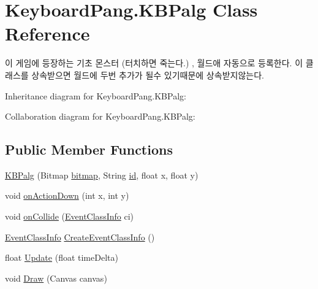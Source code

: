 \hypertarget{class_keyboard_pang_1_1_k_b_palg}{\section{Keyboard\-Pang.\-K\-B\-Palg Class Reference}
\label{class_keyboard_pang_1_1_k_b_palg}
}


이 게임에 등장하는 기초 몬스터 (터치하면 죽는다.) , 월드애 자동으로 등록한다. 이 클래스를 상속받으면 월드에 두번 추가가 될수 있기때문에 상속받지않는다.  




Inheritance diagram for Keyboard\-Pang.\-K\-B\-Palg\-:


Collaboration diagram for Keyboard\-Pang.\-K\-B\-Palg\-:
\subsection*{Public Member Functions}
\begin{DoxyCompactItemize}
\item 
\hyperlink{class_keyboard_pang_1_1_k_b_palg_a6970afd8c4df028842ef1a7e2d2444ca}{K\-B\-Palg} (Bitmap \hyperlink{class_technology_1_1_game_1_1_game_object_a5aeb4d82bc8af3adef261b5a953dcc32}{bitmap}, String \hyperlink{class_technology_1_1_game_1_1_base_object_a927863afc6c09e86a2f5916970b7bbe3}{id}, float x, float y)
\item 
void \hyperlink{class_keyboard_pang_1_1_k_b_palg_a46bcad7e87f0e49f40b9b515740eb2ae}{on\-Action\-Down} (int x, int y)
\item 
void \hyperlink{class_keyboard_pang_1_1_k_b_palg_a557afc5dc5c12aa8792774a61915320b}{on\-Collide} (\hyperlink{class_technology_1_1_event_1_1_event_class_info}{Event\-Class\-Info} ci)
\item 
\hyperlink{class_technology_1_1_event_1_1_event_class_info}{Event\-Class\-Info} \hyperlink{class_keyboard_pang_1_1_k_b_palg_a938720421dbd621a23fc0746167e4314}{Create\-Event\-Class\-Info} ()
\item 
float \hyperlink{class_keyboard_pang_1_1_k_b_palg_ad6d5de2cac142aff2c2fb0441b49828b}{Update} (float time\-Delta)
\item 
void \hyperlink{class_keyboard_pang_1_1_k_b_palg_abf91c0b68677d814f6e4cfa6788df007}{Draw} (Canvas canvas)
\end{DoxyCompactItemize}
